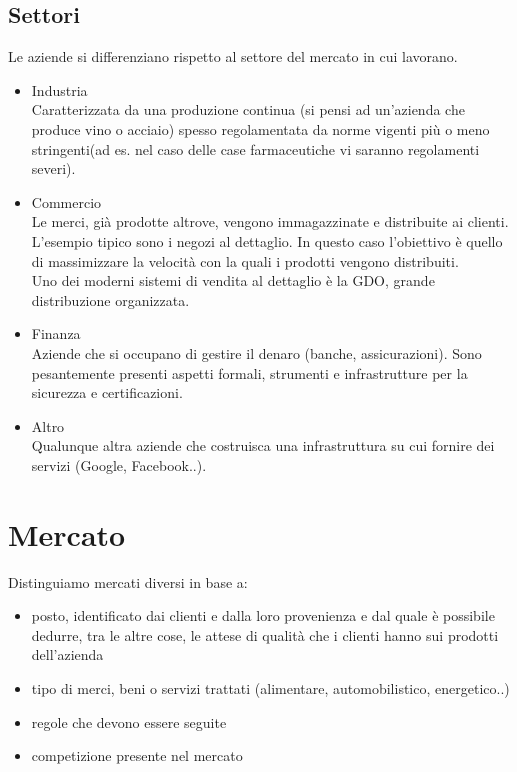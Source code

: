 \subsection{Settori}
Le aziende si differenziano rispetto al settore del mercato in cui lavorano.
\begin{itemize}
\item Industria \\
			Caratterizzata da una produzione continua (si pensi ad un'azienda che produce vino o acciaio) spesso regolamentata da norme vigenti pi\`u o meno stringenti(ad es. nel caso delle case farmaceutiche vi saranno regolamenti severi).
\item Commercio \\
			Le merci, gi\`a prodotte altrove, vengono immagazzinate e distribuite ai clien\-ti. L'esempio tipico sono i negozi al dettaglio. In questo caso l'obiettivo \`e quello di massimizzare la velocit\`a con la quali i prodotti vengono distribuiti. \\
Uno dei moderni sistemi di vendita al dettaglio \`e la \textsf{GDO}, grande distribuzione organizzata.
\item Finanza \\
			Aziende che si occupano di gestire il denaro (banche, assicurazioni). Sono pesantemente presenti aspetti formali, strumenti e infrastrutture per la sicurezza e certificazioni.
\item Altro \\
			Qualunque altra aziende che costruisca una infrastruttura su cui fornire dei servizi (Google, Facebook..).
\end{itemize}

\section{Mercato}
Distinguiamo mercati diversi in base a:
\begin{itemize}
\item posto, identificato dai clienti e dalla loro provenienza e dal quale \`e possibile dedurre, tra le altre cose, le attese di qualit\`a che i clienti hanno sui prodotti dell'azienda
\item tipo di merci, beni o servizi trattati (alimentare, automobilistico, energetico..)
\item regole che devono essere seguite
\item competizione presente nel mercato
\end{itemize}

